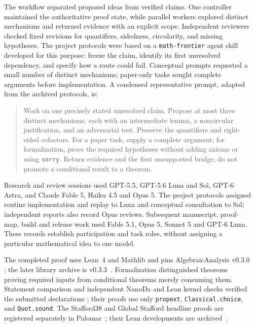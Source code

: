\documentclass[11pt]{amsart}
\numberwithin{equation}{section}
\theoremstyle{plain}
\theoremstyle{remark}
\begin{document}
\begin{appendix}
The workflow separated proposed ideas from verified claims. One controller
maintained the authoritative proof state, while parallel workers explored
distinct mechanisms and returned evidence with an explicit scope.
Independent reviewers checked fixed revisions for quantifiers, sidedness,
circularity, and missing hypotheses. The project protocols were based
on a \texttt{math-frontier} agent skill developed for this purpose: freeze the
claim, identify its first unresolved dependency, and specify how a route
could fail. Conceptual prompts requested a small number of distinct
mechanisms; paper-only tasks sought complete arguments before implementation.
A condensed representative prompt, adapted from the archived protocols, is:
\begin{quote}\small
Work on one precisely stated unresolved claim. Propose at most three
distinct mechanisms, each with an intermediate lemma, a noncircular
justification, and an adversarial test. Preserve the quantifiers and
right-sided cofactors. For a paper task, supply a complete argument; for
formalization, prove the required hypotheses without adding axioms or
using \texttt{sorry}. Return evidence and the first unsupported bridge; do not
promote a conditional result to a theorem.
\end{quote}

Research and review sessions used GPT-5.5, GPT-5.6 Luna and Sol,
GPT-6 Astra, and Claude Fable 5, Haiku 4.5 and Opus 5. The project protocols
assigned routine implementation and replay to Luna and conceptual
consultation to Sol; independent reports also record Opus reviews.
Subsequent manuscript, proof-map, build and release work used Fable 5.1,
Opus 5, Sonnet 5 and GPT-6 Luna. These records establish participation and task roles,
without assigning a particular mathematical idea to one model.

The completed proof uses Lean~4 and Mathlib and pins AlgebraicAnalysis v0.3.0
\cite{Lean4,Mathlib2020,AlgebraicAnalysis030}; the later library archive is v0.3.3~\cite{AlgebraicAnalysis033}.
Formalization distinguished theorems proving required inputs from
conditional theorems merely consuming them. Statement comparison and
independent NanoDa and Lean kernel checks verified the submitted declarations
\cite{Comparator,NanoDa,PalomarDocs}; their proofs use only
\texttt{propext}, \texttt{Classical.choice}, and \texttt{Quot.sound}.
The Stafford38 and Global Stafford headline proofs are registered separately in
Palomar~\cite{Stafford38Palomar2026,GlobalStaffordPalomar2026}; their Lean developments are archived~\cite{Stafford38Zenodo123,GlobalStaffordZenodo106}.


\end{appendix}
\end{document}

